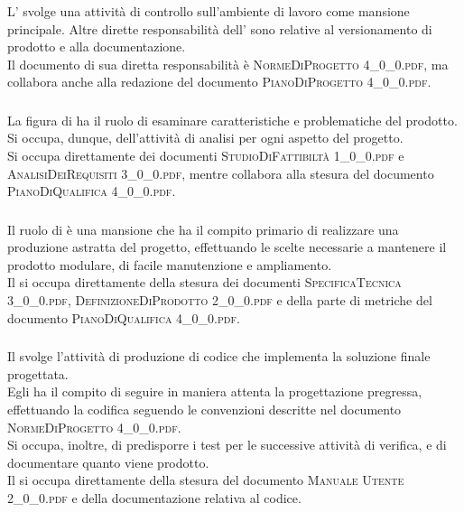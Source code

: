 		\subsubsection{\Amm}
		L'\textit{\Amm} svolge una attività di controllo sull'ambiente di lavoro come mansione principale. Altre dirette responsabilità dell'\textit{\Amm} sono relative al versionamento di prodotto e alla documentazione.\\
		Il documento di sua diretta responsabilità è \textsc{NormeDiProgetto 4\_0\_0.pdf}, ma collabora anche alla redazione del documento \textsc{PianoDiProgetto 4\_0\_0.pdf}.
		
		\subsubsection{\Ana}
		La figura di \textit{\Ana} ha il ruolo di esaminare caratteristiche e problematiche del prodotto. Si occupa, dunque, dell'attività di analisi per ogni aspetto del progetto.\\
		Si occupa direttamente dei documenti \textsc{StudioDiFattibiltà 1\_0\_0.pdf} e \textsc{AnalisiDeiRequisiti 3\_0\_0.pdf}, mentre collabora alla stesura del documento \textsc{PianoDiQualifica 4\_0\_0.pdf}.

		\subsubsection{\Prog}
		Il ruolo di \textit{\Prog} è una mansione che ha il compito primario di realizzare una produzione astratta del progetto, effettuando le scelte necessarie a mantenere il prodotto modulare, di facile manutenzione e ampliamento.\\
		Il \textit{\Prog} si occupa direttamente della stesura dei documenti \textsc{SpecificaTecnica 3\_0\_0.pdf}, \textsc{DefinizioneDiProdotto 2\_0\_0.pdf} e della parte di metriche del documento \textsc{PianoDiQualifica 4\_0\_0.pdf}.
		
		\subsubsection{\Progr}
		Il \textit{\Progr} svolge l'attività di produzione di codice che implementa la soluzione finale progettata.\\
		Egli ha il compito di seguire in maniera attenta la progettazione pregressa, effettuando la codifica seguendo le convenzioni descritte nel documento \textsc{NormeDiProgetto 4\_0\_0.pdf}.\\
		Si occupa, inoltre, di predisporre i test per le successive attività di verifica, e di documentare quanto viene prodotto.\\
		Il \textit{\Progr} si occupa direttamente della stesura del documento \textsc{Manuale Utente 2\_0\_0.pdf} e della documentazione relativa al codice.
		
